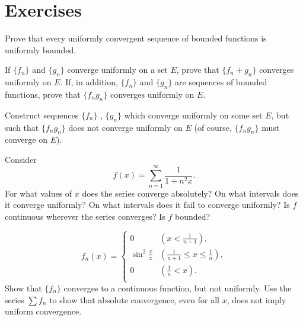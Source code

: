 \section{Exercises}

\begin{myexercise}
    \label{ex:7.1}
    Prove that every uniformly convergent sequence of bounded functions is uniformly bounded.
\end{myexercise}


\begin{myexercise}
    \label{ex:7.2}
    If $\{f_n\}$ and $\{g_n\}$ converge uniformly on a set $E$, prove that $\{f_n+g_n\}$ converges uniformly on $E$.
    If, in addition, $\{f_n\}$ and $\{g_n\}$ are sequences of bounded functions, prove that $\{f_n g_n\}$ converges uniformly on $E$.
\end{myexercise}


\begin{myexercise}
    \label{ex:7.3}
    Construct sequences $\{f_n\}$ , $\{g_n\}$ which converge uniformly on some set $E$, but such that $\{f_n g_n\}$ 
    does not converge uniformly on $E$ 
    (of course, $\{f_n g_n\}$ must converge on $E$).
\end{myexercise}


\begin{myexercise}
    \label{ex:7.4}
    Consider 
    \begin{equation*}
        f(x) = \sum_{n=1}^{\infty} \frac{1}{1+n^2x} .
    \end{equation*}
    For what values of $x$ does the series converge absolutely?
    On what intervals does it converge uniformly?
    On what intervals does it fail to converge uniformly?
    Is $f$ continuous wherever the series converges?
    Is $f$ bounded?
\end{myexercise}


\begin{myexercise}
    \label{ex:7.5}
    \begin{equation*}
        f_n(x) = \left\{ 
            \begin{array}{ll}
                0 & \left( x<\frac{1}{n+1} \right), \\
                \sin^2 \frac{\pi}{x} & \left( \frac{1}{n+1}\leq x \leq \frac{1}{n} \right), \\
                0 & \left( \frac{1}{n} < x \right). \\ 
            \end{array}
         \right.
    \end{equation*}
    Show that $\{f_n\}$ converges to a continuous function, but not uniformly. 
    Use the series $\sum f_n$ to show that absolute convergence, even for all $x$, does not imply uniform convergence.
\end{myexercise}


